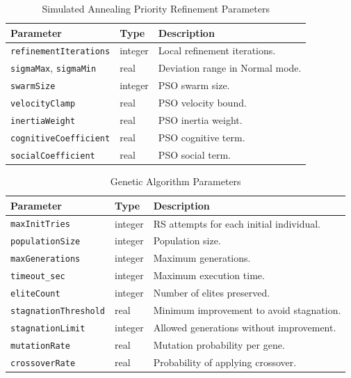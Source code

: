 \begin{table}[h]
\centering
\caption{Simulated Annealing Priority Refinement Parameters}
\begin{tabular}{lll}
\toprule
Parameter & Type & Description \\
\midrule
\texttt{refinementIterations} & integer & Local refinement iterations. \\
\texttt{sigmaMax}, \texttt{sigmaMin} & real & Deviation range in Normal mode. \\
\texttt{swarmSize} & integer & PSO swarm size. \\
\texttt{velocityClamp} & real & PSO velocity bound. \\
\texttt{inertiaWeight} & real & PSO inertia weight. \\
\texttt{cognitiveCoefficient} & real & PSO cognitive term. \\
\texttt{socialCoefficient} & real & PSO social term. \\
\bottomrule
\end{tabular}
\end{table}

\begin{table}[h]
\centering
\caption{Genetic Algorithm Parameters}
\begin{tabular}{lll}
\toprule
Parameter & Type & Description \\
\midrule
\texttt{maxInitTries} & integer & RS attempts for each initial individual. \\
\texttt{populationSize} & integer & Population size. \\
\texttt{maxGenerations} & integer & Maximum generations. \\
\texttt{timeout\_sec} & integer & Maximum execution time. \\
\texttt{eliteCount} & integer & Number of elites preserved. \\
\texttt{stagnationThreshold} & real & Minimum improvement to avoid stagnation. \\
\texttt{stagnationLimit} & integer & Allowed generations without improvement. \\
\texttt{mutationRate} & real & Mutation probability per gene. \\
\texttt{crossoverRate} & real & Probability of applying crossover. \\
\bottomrule
\end{tabular}
\end{table}
